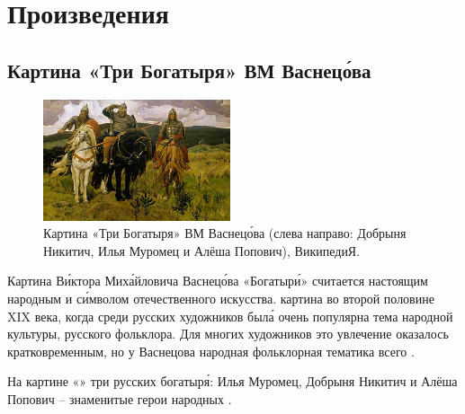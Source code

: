 \section{Произведения}
\subsection{Картина «Три Богатыря» ВМ Васнец\'{о}ва}

\begin{figure}
    \begin{center}
        \includegraphics[width=0.49\textwidth]{img/tri_bogatyrya.jpg}
    \end{center}
    \caption{Картина «Три Богатыря» ВМ Васнец\'{о}ва (слева направо: Добрыня Никитич, Илья Муромец и Алёша Попович), ВикипедиЯ.}
\end{figure}
Картина В\'{и}ктора Мих\'{а}йловича Васнец\'{о}ва «Богатыр\'{и}»  считается настоящим народным  и с\'{и}мволом отечественного искусства.  картина во второй половине XIX века, когда среди русских художников был\'{а} очень популярна тема народной культуры, русского фольклора. Для многих художников это увлечение оказалось кратковременным, но у Васнецова народная фольклорная тематика   всего .


На картине «»  три русских богатыр\'{я}: Илья Муромец, Добрыня Никитич и Алёша Попович -- знаменитые герои народных .


